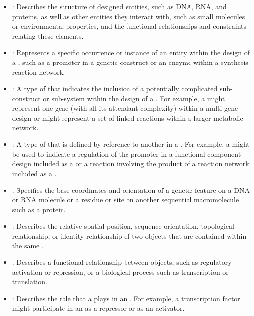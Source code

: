 \begin{itemize}

\item \emph{}: Describes the structure of designed entities, such as DNA, RNA, and proteins, as well as other entities they interact with, such as small molecules or environmental properties, and the functional relationships and constraints relating these elements.

\item \emph{}:
Represents a specific occurrence or instance of an entity within the design of a , such as a promoter in a genetic construct or an enzyme within a synthesis reaction network.

\item \emph{}:
A type of  that indicates the inclusion of a potentially complicated sub-construct or sub-system within the design of a . For example, a  might represent one gene (with all its attendant complexity) within a multi-gene design or might represent a set of linked reactions within a larger metabolic network.

\item \emph{}:
A type of  that is defined by reference to another  in a . For example, a  might be used to indicate a regulation of the promoter in a functional component design included as a  or a reaction involving the product of a reaction network included as a .


\item \emph{}:
Specifies the base coordinates and orientation of a genetic feature on a DNA or RNA molecule or a residue or site on another sequential macromolecule such as a protein.


\item \emph{}:
Describes the relative spatial position, sequence orientation, topological relationship, or identity relationship of two  objects that are contained within the same .

\item \emph{}:
Describes a functional relationship between  objects, such as regulatory activation or repression, or a biological process such as transcription or translation.

\item \emph{}:
Describes the role that a  plays in an .
For example, a transcription factor might participate in an  as a repressor or as an activator.

\end{itemize}
